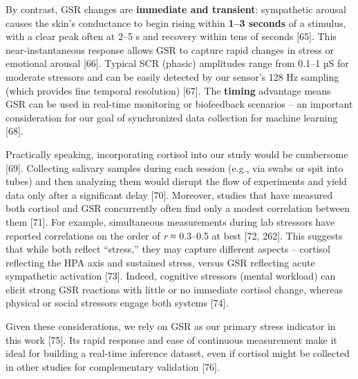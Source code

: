 \documentclass{article}
\begin{document}
    By contrast, GSR changes are \textbf{immediate and transient}: sympathetic arousal causes the skin’s conductance to begin rising within \textbf{1–3 seconds} of a stimulus, with a clear peak often at 2–5 s and recovery within tens of seconds [65]. This near-instantaneous response allows GSR to capture rapid changes in stress or emotional arousal [66]. Typical SCR (phasic) amplitudes range from 0.1–1 µS for moderate stressors and can be easily detected by our sensor’s 128 Hz sampling (which provides fine temporal resolution) [67]. The \textbf{timing} advantage means GSR can be used in real-time monitoring or biofeedback scenarios – an important consideration for our goal of synchronized data collection for machine learning [68].

    Practically speaking, incorporating cortisol into our study would be cumbersome [69]. Collecting salivary samples during each session (e.g., via swabs or spit into tubes) and then analyzing them would disrupt the flow of experiments and yield data only after a significant delay [70]. Moreover, studies that have measured both cortisol and GSR concurrently often find only a modest correlation between them [71]. For example, simultaneous measurements during lab stressors have reported correlations on the order of \textit{r} ≈ 0.3–0.5 at best [72, 262]. This suggests that while both reflect “stress,” they may capture different aspects – cortisol reflecting the HPA axis and sustained stress, versus GSR reflecting acute sympathetic activation [73]. Indeed, cognitive stressors (mental workload) can elicit strong GSR reactions with little or no immediate cortisol change, whereas physical or social stressors engage both systems [74].

    Given these considerations, we rely on GSR as our primary stress indicator in this work [75]. Its rapid response and ease of continuous measurement make it ideal for building a real-time inference dataset, even if cortisol might be collected in other studies for complementary validation [76].
\end{document}
